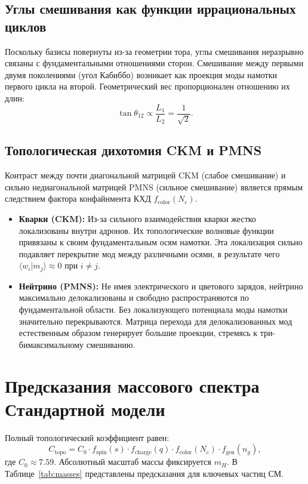 \documentclass[12pt,a4paper]{article}
\begin{document}
\subsection{Углы смешивания как функции иррациональных циклов}
Поскольку базисы повернуты из-за геометрии тора, углы смешивания неразрывно связаны с фундаментальными отношениями сторон. Смешивание между первыми двумя поколениями (угол Кабиббо) возникает как проекция моды намотки первого цикла на второй. Геометрический вес пропорционален отношению их длин:
\begin{equation}
    \tan \theta_{12} \propto \frac{L_1}{L_2} = \frac{1}{\sqrt{2}}.
\end{equation}

\subsection{Топологическая дихотомия CKM и PMNS}
Контраст между почти диагональной матрицей CKM (слабое смешивание) и сильно недиагональной матрицей PMNS (сильное смешивание) является прямым следствием фактора конфайнмента КХД $f_{\text{color}}(N_c)$.

\begin{itemize}
    \item \textbf{Кварки (CKM):} Из-за сильного взаимодействия кварки жестко локализованы внутри адронов. Их топологические волновые функции привязаны к своим фундаментальным осям намотки. Эта локализация сильно подавляет перекрытие мод между различными осями, в результате чего $\langle w_i | m_j \rangle \approx 0$ при $i \neq j$.
    \item \textbf{Нейтрино (PMNS):} Не имея электрического и цветового зарядов, нейтрино максимально делокализованы и свободно распространяются по фундаментальной области. Без локализующего потенциала моды намотки значительно перекрываются. Матрица перехода для делокализованных мод естественным образом генерирует большие проекции, стремясь к три-бимаксимальному смешиванию.
\end{itemize}

\section{Предсказания массового спектра Стандартной модели}
Полный топологический коэффициент равен:
\begin{equation}
    C_{\text{topo}} = C_0 \cdot f_{\text{spin}}(s) \cdot f_{\text{charge}}(q) \cdot f_{\text{color}}(N_c) \cdot f_{\text{gen}}(n_g),
\end{equation}
где $C_0 \approx 7.59$. Абсолютный масштаб массы фиксируется $m_H$. В Таблице~\ref{tab:masses} представлены предсказания для ключевых частиц СМ.
\end{document}
